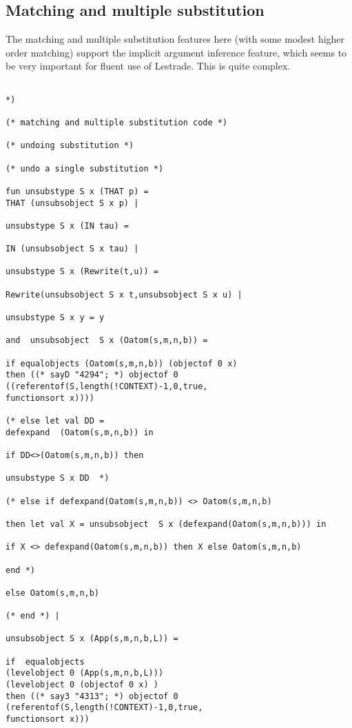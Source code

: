 \documentclass[12pt]{article}
\begin{document}
\newpage

\subsection{Matching and multiple substitution}

The matching and multiple substitution features here (with some modest higher order matching) support the implicit argument inference feature, which seems to be very
important for fluent use of Lestrade.  This is quite complex.

\begin{verbatim}

*)

(* matching and multiple substitution code *)

(* undoing substitution *)

(* undo a single substitution *)

fun unsubstype S x (THAT p) =
THAT (unsubsobject S x p) |

unsubstype S x (IN tau) =

IN (unsubsobject S x tau) |

unsubstype S x (Rewrite(t,u)) =

Rewrite(unsubsobject S x t,unsubsobject S x u) |

unsubstype S x y = y

and  unsubsobject  S x (Oatom(s,m,n,b)) =

if equalobjects (Oatom(s,m,n,b)) (objectof 0 x) 
then ((* sayD "4294"; *) objectof 0 ((referentof(S,length(!CONTEXT)-1,0,true,
functionsort x))))

(* else let val DD = 
defexpand  (Oatom(s,m,n,b)) in 

if DD<>(Oatom(s,m,n,b)) then 

unsubstype S x DD  *)

(* else if defexpand(Oatom(s,m,n,b)) <> Oatom(s,m,n,b)

then let val X = unsubsobject  S x (defexpand(Oatom(s,m,n,b))) in

if X <> defexpand(Oatom(s,m,n,b)) then X else Oatom(s,m,n,b)

end *)

else Oatom(s,m,n,b)

(* end *) |

unsubsobject S x (App(s,m,n,b,L)) =

if  equalobjects 
(levelobject 0 (App(s,m,n,b,L))) 
(levelobject 0 (objectof 0 x) )
then ((* say3 "4313"; *) objectof 0 (referentof(S,length(!CONTEXT)-1,0,true,
functionsort x)))


\end{verbatim}
\end{document}

